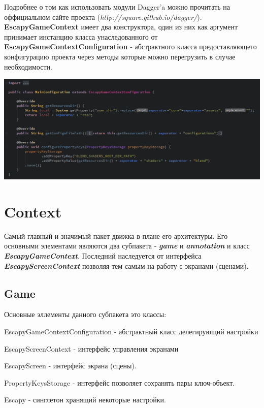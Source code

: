 \documentclass[11pt]{report}
\newenvironment{itemize*}%
  {\begin{itemize}%
    \setlength{\itemsep}{2pt}%
    \setlength{\parskip}{0.75pt}}%
  {\end{itemize}}
\begin{document}
Подробнее о том как использовать модули Dagger'a можно прочитать на оффициальном  сайте проекта (\textit{http://square.github.io/dagger/}). \textbf{EscapyGameContext} имеет два конструктора, один из них как аргумент принимает инстанцию класса унаследованного от
\textbf{EscapyGameContextConfiguration} - абстрактного класса предоставляющего конфигурацию проекта через методы которые можно перегрузить в случае необходимости.
\begin{center}
	\includegraphics[width=1.2\linewidth]{img/4.png} 
  	\label{img:4} 
\end{center}


\chapter{Context}
Самый главный и значимый пакет движка в плане его архитектуры. Его основными элементами
являются два субпакета - \textit{\textbf{game}} и \textit{\textbf{annotation}} и класс
\textit{\textbf{EscapyGameContext}}. Последний наследуется от интерфейса \textit{\textbf{EscapyScreenContext}} позволяя тем самым на работу с экранами (сценами).

\section{Game}
Основные эллементы данного субпакета это классы: \begin{itemize*}
\item EscapyGameContextConfiguration - абстрактный класс делегирующий настройки
\item EscapyScreenContext - интерфейс управления экранами
\item EscapyScreen - интерфейс экрана (сцены).
\item PropertyKeysStorage - интерфейс позволяет сохранять пары ключ-объект.
\item Escapy - синглетон хранящий некоторые настройки.
\\
\end{itemize*}
\end{document}
